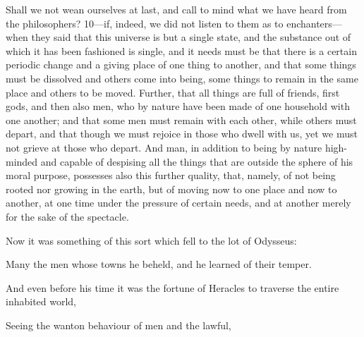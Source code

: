 Shall we not wean ourselves at last, and call to mind what we have heard from the philosophers? 10—if, indeed, we did not listen to them as to enchanters—when they said that this universe is but a single state, and the substance out of which it has been fashioned is single, and it needs must be that there is a certain periodic change and a giving place of one thing to another, and that some things must be dissolved and others come into being, some things to remain in the same place and others to be moved. Further, that all things are full of friends, first gods, and then also men, who by nature have been made of one household with one another; and that some men must remain with each other, while others must depart, and that though we must rejoice in those who dwell with us, yet we must not grieve at those who depart. And man, in addition to being by nature high-minded and capable of despising all the things that are outside the sphere of his moral purpose, possesses also this further quality, that, namely, of not being rooted nor growing in the earth, but of moving now to one place and now to another, at one time under the pressure of certain needs, and at another merely for the sake of the spectacle.

Now it was something of this sort which fell to the lot of Odysseus:

Many the men whose towns he beheld, and he learned of their temper.

And even before his time it was the fortune of Heracles to traverse the entire inhabited world,

Seeing the wanton behaviour of men and the lawful,

